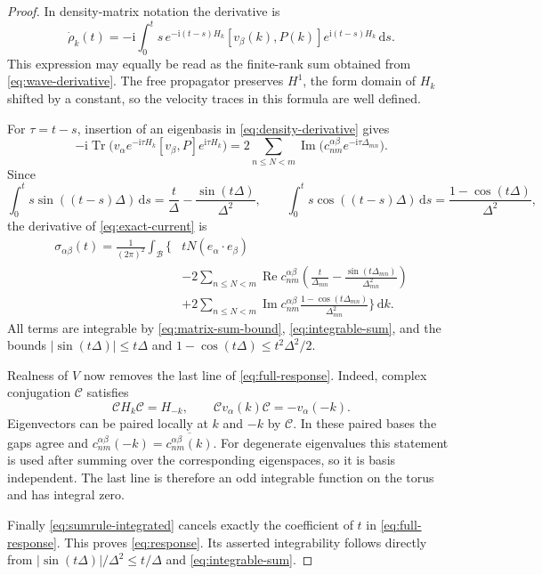 \documentclass[11pt,a4paper]{article}
\numberwithin{equation}{section}
\newcommand{\cB}{\mathcal B}
\newcommand{\dd}{\,\mathrm d}
\newcommand{\ii}{\mathrm i}
\DeclareMathOperator{\Tr}{Tr}
\DeclareMathOperator{\Rea}{Re}
\DeclareMathOperator{\Ima}{Im}
\theoremstyle{remark}
\begin{document}
\begin{proof}
In density-matrix notation the derivative is
\begin{equation}\label{eq:density-derivative}
 \dot\rho_k(t)=-\ii\int_0^t s\,
       e^{-\ii(t-s)H_k}[v_\beta(k),P(k)]
       e^{\ii(t-s)H_k}\dd s.
\end{equation}
This expression may equally be read as the finite-rank sum obtained
from \eqref{eq:wave-derivative}. The free propagator preserves $H^1$,
the form domain of $H_k$ shifted by a constant, so the velocity traces
in this formula are well defined.

For $\tau=t-s$, insertion of an eigenbasis in
\eqref{eq:density-derivative} gives
\[
 -\ii\Tr\bigl(v_\alpha e^{-\ii\tau H_k}
             [v_\beta,P]e^{\ii\tau H_k}\bigr)
 =2\sum_{n\leq N<m}
       \Ima\bigl(c_{nm}^{\alpha\beta}e^{-\ii\tau\Delta_{mn}}\bigr).
\]
Since
\[
 \int_0^t s\sin((t-s)\Delta)\dd s
     =\frac{t}{\Delta}-\frac{\sin(t\Delta)}{\Delta^2},\qquad
 \int_0^t s\cos((t-s)\Delta)\dd s
     =\frac{1-\cos(t\Delta)}{\Delta^2},
\]
the derivative of \eqref{eq:exact-current} is
\begin{equation}\label{eq:full-response}
\begin{split}
 \sigma_{\alpha\beta}(t)
  =\frac1{(2\pi)^2}\int_{\cB}\Bigg\{
   &tN(e_\alpha\cdot e_\beta)\\
   &-2\sum_{n\leq N<m}\Rea c_{nm}^{\alpha\beta}
          \left(\frac{t}{\Delta_{mn}}
                    -\frac{\sin(t\Delta_{mn})}{\Delta_{mn}^2}\right)\\
   &+2\sum_{n\leq N<m}\Ima c_{nm}^{\alpha\beta}
             \frac{1-\cos(t\Delta_{mn})}{\Delta_{mn}^2}
             \Bigg\}\dd k.
\end{split}
\end{equation}
All terms are integrable by \eqref{eq:matrix-sum-bound},
\eqref{eq:integrable-sum}, and the bounds
$|\sin(t\Delta)|\leq t\Delta$ and
$1-\cos(t\Delta)\leq t^2\Delta^2/2$.

Realness of $V$ now removes the last line of \eqref{eq:full-response}.
Indeed, complex conjugation $\mathcal C$ satisfies
\begin{equation}\label{eq:time-reversal}
 \mathcal C H_k\mathcal C=H_{-k},\qquad
 \mathcal C v_\alpha(k)\mathcal C=-v_\alpha(-k).
\end{equation}
Eigenvectors can be paired locally at $k$ and $-k$ by $\mathcal C$.
In these paired bases the gaps agree and
$c_{nm}^{\alpha\beta}(-k)=\overline{c_{nm}^{\alpha\beta}(k)}$.
For degenerate eigenvalues this statement is used after summing over
the corresponding eigenspaces, so it is basis independent. The last
line is therefore an odd integrable function on the torus and has
integral zero.

Finally \eqref{eq:sumrule-integrated} cancels exactly the coefficient
of $t$ in \eqref{eq:full-response}. This proves \eqref{eq:response}.
Its asserted integrability follows directly from
$|\sin(t\Delta)|/\Delta^2\leq t/\Delta$ and
\eqref{eq:integrable-sum}.
\end{proof}
\end{document}
